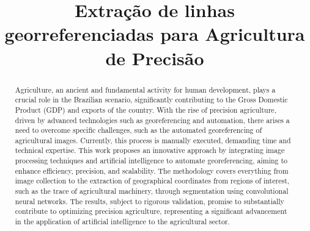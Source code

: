 \documentclass[conference]{IEEEtran}
\begin{document}
\title{Extração de linhas georreferenciadas para Agricultura de Precisão\\
 }

\author{
\and
{}
\and
{}
}


\maketitle

\begin{abstract}
    Agriculture, an ancient and fundamental activity for human development, 
    plays a crucial role in the Brazilian scenario, significantly contributing to the 
    Gross Domestic Product (GDP) and exports of the country. 
    With the rise of precision agriculture, driven by advanced technologies such as georeferencing 
    and automation, there arises a need to overcome specific challenges, such as the automated 
    georeferencing of agricultural images. Currently, this process is manually executed, 
    demanding time and technical expertise. This work proposes an innovative approach by 
    integrating image processing techniques and artificial intelligence to automate georeferencing, 
    aiming to enhance efficiency, precision, and scalability. The methodology covers everything 
    from image collection to the extraction of geographical coordinates from regions of interest, 
    such as the trace of agricultural machinery, through segmentation using convolutional neural 
    networks. The results, subject to rigorous validation, promise to substantially contribute to 
    optimizing precision agriculture, representing a significant advancement in the application of
    artificial intelligence to the agricultural sector.
\end{abstract}
\end{document}
